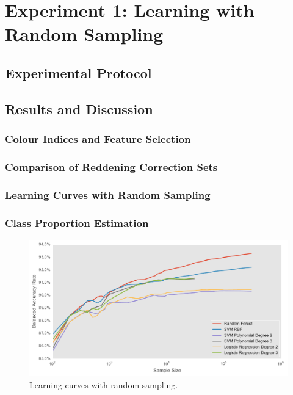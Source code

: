 
\chapter{Experiment 1: Learning with Random Sampling}
\label{cha:expt1}



\section{Experimental Protocol}
\label{sec:protocol1}



\section{Results and Discussion}
\label{sec:results1}

\subsection{Colour Indices and Feature Selection}

\subsection{Comparison of Reddening Correction Sets}

\subsection{Learning Curves with Random Sampling}

\subsection{Class Proportion Estimation}

\begin{figure}[tbp]
	\centering
	\includegraphics[width=\textwidth]{figures/learning_curves}
	\caption{Learning curves with random sampling.}
	\label{fig:learning}
\end{figure}



